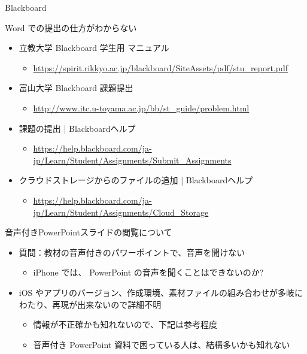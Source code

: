 \documentclass[a4j,10pt]{jsarticle}
\begin{document}
{\begin{frame}[label={sec:org166405d},fragile]{Blackboard}
\begin{block}{Word での提出の仕方がわからない}
\begin{itemize}
\par
\item 立教大学 Blackboard 学生用 マニュアル
\begin{itemize}
\item \url{https://spirit.rikkyo.ac.jp/blackboard/SiteAssets/pdf/stu\_report.pdf}
\end{itemize}
\par
\item 富山大学 Blackboard 課題提出
\begin{itemize}
\item \url{http://www.itc.u-toyama.ac.jp/bb/st\_guide/problem.html}
\end{itemize}
\par
\item 課題の提出 | Blackboardヘルプ
\begin{itemize}
\item \url{https://help.blackboard.com/ja-jp/Learn/Student/Assignments/Submit\_Assignments}
\end{itemize}
\par
\item クラウドストレージからのファイルの追加 | Blackboardヘルプ
\begin{itemize}
\item \url{https://help.blackboard.com/ja-jp/Learn/Student/Assignments/Cloud\_Storage}
\end{itemize}
\end{itemize}
\end{block}
\par
\begin{block}{音声付きPowerPointスライドの閲覧について}
\begin{itemize}
\item 質問：教材の音声付きのパワーポイントで、音声を聞けない
\begin{itemize}
\item iPhone では、 PowerPoint の音声を聞くことはできないのか?
\end{itemize}
\par
\item iOS やアプリのバージョン、作成環境、素材ファイルの組み合わせが多岐にわたり、再現が出来ないので詳細不明
\begin{itemize}
\item 情報が不正確かも知れないので、下記は参考程度
\item 音声付き PowerPoint 資料で困っている人は、結構多いかも知れない
\end{itemize}
\end{itemize}

\end{block}
\end{frame}}
\end{document}
